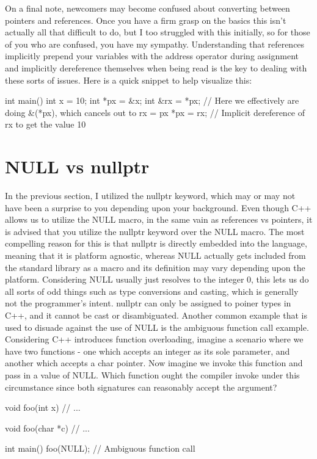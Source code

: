 \documentclass{article}
\begin{document}
On a final note, newcomers may become confused about converting between pointers and references. Once you
have a firm grasp on the basics this isn't actually all that difficult to do, but I too struggled with this
initially, so for those of you who are confused, you have my sympathy. Understanding that references implicitly
prepend your variables with the address operator during assignment and implicitly dereference themselves when
being read is the key to dealing with these sorts of issues. Here is  a quick snippet to help visualize this:

\begin{cpplst}
    int main()
    {
        int x = 10;
        int *px = &x;
        int &rx = *px; // Here we effectively are doing &(*px), which cancels out to rx = px
        *px = rx; // Implicit dereference of rx to get the value 10
    }
\end{cpplst}

\section{NULL vs nullptr}

In the previous section, I utilized the nullptr keyword, which may or may not have been a surprise to you
depending upon your background. Even though C++ allows us to utilize the NULL macro, in the same vain as
references vs pointers, it is advised that you utilize the nullptr keyword over the NULL macro. The most
compelling reason for this is that nullptr is directly embedded into the language, meaning that it is platform
agnostic, whereas NULL actually gets included from the standard library as a macro and its definition may
vary depending upon the platform. Considering NULL usually just resolves to the integer 0, this lets us do
all sorts of odd things such as type conversions and casting, which is generally not the programmer's intent.
nullptr can only be assigned to poiner types in C++, and it cannot be cast or disambiguated. Another common
example that is used to disuade against the use of NULL is the ambiguous function call example. Considering
C++ introduces function overloading, imagine a scenario where we have two functions - one which accepts an
integer as its sole parameter, and another which accepts a char pointer. Now imagine we invoke this function
and pass in a value of NULL. Which function ought the compiler invoke under this circumstance since both
signatures can reasonably accept the argument?

\begin{cpplst}
    void foo(int x)
    {
        // ...
    }

    void foo(char *c)
    {
        // ...
    }

    int main()
    {
        foo(NULL); // Ambiguous function call
    }
\end{cpplst}
\end{document}
